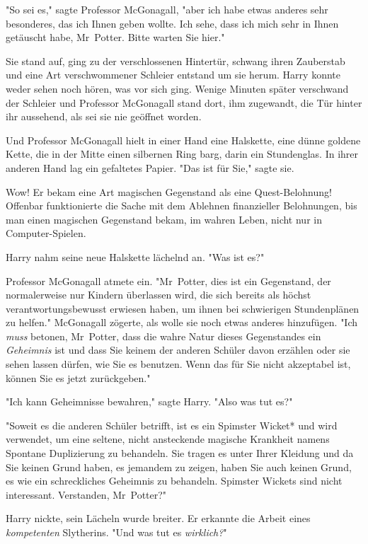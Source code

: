 {"So sei es," sagte Professor McGonagall, "aber ich habe etwas anderes sehr besonderes, das ich Ihnen geben wollte. Ich sehe, dass ich mich sehr in Ihnen getäuscht habe, Mr~Potter. Bitte warten Sie hier."

Sie stand auf, ging zu der verschlossenen Hintertür, schwang ihren Zauberstab und eine Art verschwommener Schleier entstand um sie herum. Harry konnte weder sehen noch hören, was vor sich ging. Wenige Minuten später verschwand der Schleier und Professor McGonagall stand dort, ihm zugewandt, die Tür hinter ihr aussehend, als sei sie nie geöffnet worden.

Und Professor McGonagall hielt in einer Hand eine Halskette, eine dünne goldene Kette, die in der Mitte einen silbernen Ring barg, darin ein Stundenglas. In ihrer anderen Hand lag ein gefaltetes Papier. "Das ist für Sie," sagte sie.

Wow! Er bekam eine Art magischen Gegenstand als eine Quest-Belohnung! Offenbar funktionierte die Sache mit dem Ablehnen finanzieller Belohnungen, bis man einen magischen Gegenstand bekam, im wahren Leben, nicht nur in Computer-Spielen.

Harry nahm seine neue Halskette lächelnd an. "Was ist es?"

Professor McGonagall atmete ein. "Mr~Potter, dies ist ein Gegenstand, der normalerweise nur Kindern überlassen wird, die sich bereits als höchst verantwortungsbewusst erwiesen haben, um ihnen bei schwierigen Stundenplänen zu helfen." McGonagall zögerte, als wolle sie noch etwas anderes hinzufügen. "Ich \emph{muss} betonen, Mr~Potter, dass die wahre Natur dieses Gegenstandes ein \emph{Geheimnis} ist und dass Sie keinem der anderen Schüler davon erzählen oder sie sehen lassen dürfen, wie Sie es benutzen. Wenn das für Sie nicht akzeptabel ist, können Sie es jetzt zurückgeben."

"Ich kann Geheimnisse bewahren," sagte Harry. "Also was tut es?"

"Soweit es die anderen Schüler betrifft, ist es ein Spimster Wicket* und wird verwendet, um eine seltene, nicht ansteckende magische Krankheit namens Spontane Duplizierung zu behandeln. Sie tragen es unter Ihrer Kleidung und da Sie keinen Grund haben, es jemandem zu zeigen, haben Sie auch keinen Grund, es wie ein schreckliches Geheimnis zu behandeln. Spimster Wickets sind nicht interessant. Verstanden, Mr~Potter?"

Harry nickte, sein Lächeln wurde breiter. Er erkannte die Arbeit eines \emph{kompetenten} Slytherins. "Und was tut es \emph{wirklich?}"

}
